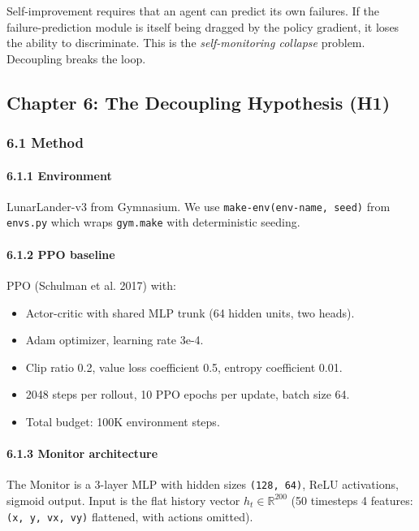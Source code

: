 \documentclass[11pt]{article}
\begin{document}
Self-improvement requires that an agent can predict its own failures. If the
failure-prediction module is itself being dragged by the policy gradient, it
loses the ability to discriminate. This is the \textit{self-monitoring collapse}
problem. Decoupling breaks the loop.

\hrulefill

\subsection{Chapter 6: The Decoupling Hypothesis (H1)}

\subsubsection{6.1 Method}

\paragraph{6.1.1 Environment}

LunarLander-v3 from Gymnasium. We use \texttt{make-env(env-name, seed)} from \texttt{envs.py}
which wraps \texttt{gym.make} with deterministic seeding.

\paragraph{6.1.2 PPO baseline}

PPO (Schulman et al. 2017) with:

\begin{itemize}
  \item Actor-critic with shared MLP trunk (64 hidden units, two heads).
  \item Adam optimizer, learning rate 3e-4.
  \item Clip ratio 0.2, value loss coefficient 0.5, entropy coefficient 0.01.
  \item 2048 steps per rollout, 10 PPO epochs per update, batch size 64.
  \item Total budget: 100K environment steps.
\end{itemize}


\paragraph{6.1.3 Monitor architecture}

The Monitor is a 3-layer MLP with hidden sizes \texttt{(128, 64)}, ReLU activations,
sigmoid output. Input is the flat history vector $h_t \in \mathbb{R}^{200}$ (50 timesteps 
4 features: \texttt{(x, y, vx, vy)} flattened, with actions omitted).
\end{document}
